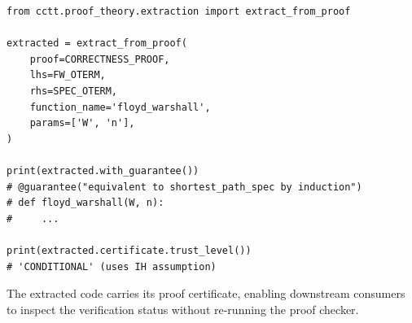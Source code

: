 \begin{lstlisting}
from cctt.proof_theory.extraction import extract_from_proof

extracted = extract_from_proof(
    proof=CORRECTNESS_PROOF,
    lhs=FW_OTERM,
    rhs=SPEC_OTERM,
    function_name='floyd_warshall',
    params=['W', 'n'],
)

print(extracted.with_guarantee())
# @guarantee("equivalent to shortest_path_spec by induction")
# def floyd_warshall(W, n):
#     ...

print(extracted.certificate.trust_level())
# 'CONDITIONAL' (uses IH assumption)
\end{lstlisting}

The extracted code carries its proof certificate, enabling
downstream consumers to inspect the verification status
without re-running the proof checker.

